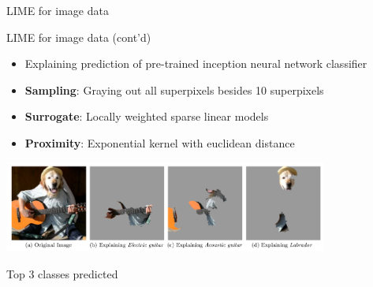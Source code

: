 \documentclass[10pt,compress,t,notes=noshow, xcolor=table]{beamer}
\begin{document}
\begin{frame}{LIME for image data}
\end{frame}
\begin{frame}{LIME for image data (cont'd) }
	\begin{itemize}
		\item Explaining prediction of pre-trained inception neural network classifier
		\item \textbf{Sampling}: Graying out all superpixels besides 10 superpixels
		\item \textbf{Surrogate}: Locally weighted sparse linear models 
		\item \textbf{Proximity}: Exponential kernel with euclidean distance
	\end{itemize}
	\vspace{-0.3cm}
	\begin{center}
		\includegraphics[width=0.8\textwidth]{figure/lime-images}
		
		{Top 3 classes predicted}
	\end{center}
	
\end{frame}
\endlecture
\end{document}
